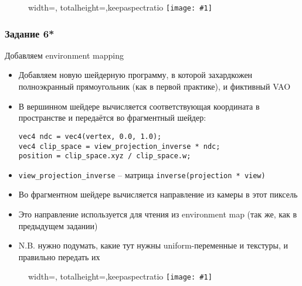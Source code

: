 \documentclass{beamer}
\newcommand{\slideimage}[1]{
  \begin{figure}
    \begin{adjustbox}{width=\textwidth, totalheight=\textheight-2\baselineskip-2\baselineskip,keepaspectratio}
      \texttt{[image: \#1]}
    \end{adjustbox}
  \end{figure}
}
\begin{document}
\begin{frame}[fragile]
\slideimage{5.png}
\end{frame}

\begin{frame}[fragile]
\frametitle{Задание 6*}
Добавляем environment mapping
\begin{itemize}
\item Добавляем новую шейдерную программу, в которой захардкожен полноэкранный прямоугольник (как в первой практике), и фиктивный VAO
\item В вершинном шейдере вычисляется соответствующая координата в пространстве и передаётся во фрагментный шейдер:
\begin{verbatim}
vec4 ndc = vec4(vertex, 0.0, 1.0);
vec4 clip_space = view_projection_inverse * ndc;
position = clip_space.xyz / clip_space.w;
\end{verbatim}
\item \verb|view_projection_inverse| -- матрица \verb|inverse(projection * view)|
\item Во фрагментном шейдере вычисляется направление из камеры в этот пиксель
\item Это направление используется для чтения из environment map (так же, как в предыдущем задании)
\item N.B. нужно подумать, какие тут нужны uniform-переменные и текстуры, и правильно передать их
\end{itemize}
\end{frame}

\begin{frame}[fragile]
\slideimage{6.png}
\end{frame}
\end{document}
